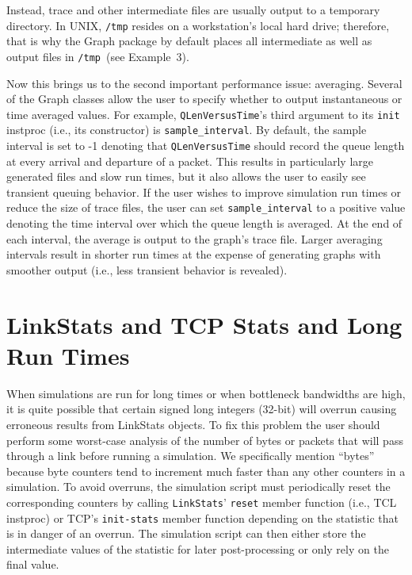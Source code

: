 \documentclass[11pt]{article}
\begin{document}
Instead, trace and other intermediate files are usually output to a
temporary directory.  In UNIX, \verb|/tmp| resides on a workstation's
local hard drive; therefore, that is why the Graph package by default
places all intermediate as well as output files in \verb|/tmp|~(see
Example~3).

Now this brings us to the second important performance issue:
averaging.  Several of the Graph classes allow the user to specify
whether to output instantaneous or time averaged values.  For example,
\verb|QLenVersusTime|'s third argument to its \verb|init| instproc
(i.e., its constructor) is \verb|sample_interval|.  By default, the
sample interval is set to -1 denoting that \verb|QLenVersusTime|
should record the queue length at every arrival and departure of a
packet.  This results in particularly large generated files and slow
run times, but it also allows the user to easily see transient
queuing behavior.  If the user wishes to improve simulation run times
or reduce the size of trace files, the user can set
\verb|sample_interval| to a positive value denoting the time interval
over which the queue length is averaged.  At the end of each interval,
the average is output to the graph's trace file.  Larger averaging intervals
result in shorter run times at the expense of generating graphs with
smoother output (i.e., less transient behavior is revealed).

\section{LinkStats and TCP Stats and Long Run Times}

When simulations are run for long times or when bottleneck bandwidths
are high, it is quite possible that certain signed long integers
(32-bit) will overrun causing erroneous results from LinkStats
objects.  To fix this problem the user should perform some worst-case
analysis of the number of bytes or packets that will pass through a
link before running a simulation.  We specifically mention ``bytes''
because byte counters tend to increment much faster than any other
counters in a simulation.  To avoid overruns, the simulation script
must periodically reset the corresponding counters by calling
\verb|LinkStats|' \verb|reset| member function (i.e., TCL instproc) or
TCP's \verb|init-stats| member function depending on the statistic
that is in danger of an overrun.  The simulation script can then
either store the intermediate values of the statistic for later
post-processing or only rely on the final value.
\end{document}
